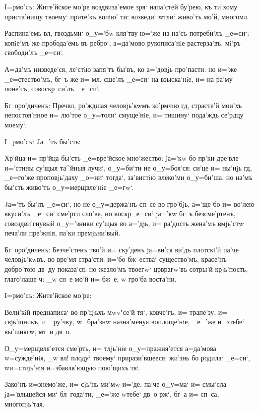 
I=рмо'съ: Жите'йское мо'ре воздвиза'емое зря` 
напа'стей бу'рею, къ ти'хому приста'нищу твоему` прите'къ 
вопiю' ти: возведи` w\т тли` живо'тъ мо'й, многомл.

Распина'емь вл, гвоздьми` о_у='бw кля'тву ю='же на 
на'съ потреби'лъ _е=си`: копiе'мъ же пробода'емь въ 
ребро`, а=да'мово рукописа'нiе растерза'въ, мi'ръ 
свободи'лъ _е=си`.

А=да'мъ низведе'ся, ле'стiю запя'тъ бы'въ, ко а='довjь 
про'пасти: но и='же _е=стество'мъ, бг~ъ же и= мл, 
сше'лъ _е=си` на взыска'нiе, и= на ра'му поне'съ, 
совоскр~си'лъ _е=си`.

Бг~оро'диченъ: Преч вл, ро'ждшая 
человjь'кwмъ ко'рмчiю гд, страсте'й мои'хъ 
непостоя'нное и= лю'тое о_у=толи` смуще'нiе, и= тишину` 
пода'ждь се'рдцу моему`. 

 I=рмо'съ: Jа='тъ бы'сть:

Хр'йца и= пр'йца бы'сть _е=вре'йское 
мно'жество: jа='кw бо пр'ки дре'вле и='стины су'щыя 
та^йныя лучи`, о_у=би'ти не о_у=боя'ся: си'це и= ны'нjь 
гд, _е=го'же проповjь'даху _о=ни` тогда`, за'вистiю 
влеко'ми о_у=би'ша. но на'мъ бы'сть живо'тъ 
о_у=мерщвле'нiе _е=гw`.

Jа='тъ бы'лъ _е=си`, но не о_у=держа'нъ сп~се во 
гро'бjь, а='ще бо и= во'лею вкуси'лъ _е=си` сме'рти 
сло'ве, но воскр _е=си` jа='кw бг~ъ безсме'ртенъ, 
совоздви'гнувый о_у='зники су'щыя во а='дjь, и= ра'дость 
жена'мъ вмjь'стw печа'ли пре'жнiя, па'ки премjьни'вый.

Бг~оро'диченъ: Безче'стенъ тво'й и= ску'денъ jа=ви'ся 
ви'дъ плотскi'й па'че человjь'кwвъ, во вре'мя стра'сти: 
и='бо бж~ества` существо'мъ, красе'нъ добро'тою дв~ду 
показа'ся: но жезло'мъ твоегw` цр врагw'въ сотры'й 
крjь'пость, глаго'лаше ч: _w сн~е мо'й и= бж~е, w\т 
гро'ба воста'ни.

 I=рмо'съ: Жите'йское мо'ре:

Вели'кiй преднаписа` во пр'цjьхъ мwv"се'й тя`, 
ковче'гъ, и= трапе'зу, и= свjь'щникъ, и= ру'чку, 
w=бра'знw назна'менуя воплоще'нiе, _е='же и=з\ъ тебе` 
вы'шнягw, мт~и дв~о.

О_у=мерщвля'ется сме'рть, и= тлjь'нiе о_у=пражня'ется 
а=да'мова w=сужде'нiя, _w вл! плоду` твоему` 
прирази'вшееся: жи'знь бо родила` _е=си`, w\т и=стлjь'нiя 
и=збавля'ющую пою'щихъ тя`.

Зако'нъ и=знемо'же, и= сjь'нь ми'мw и='де, па'че 
о_у=ма` и= смы'сла jа='вльшейся ми` бл~года'ти, _е='же 
w\т тебе` дв~о рж`, бг~а и= сп~са, многопjь'тая.

